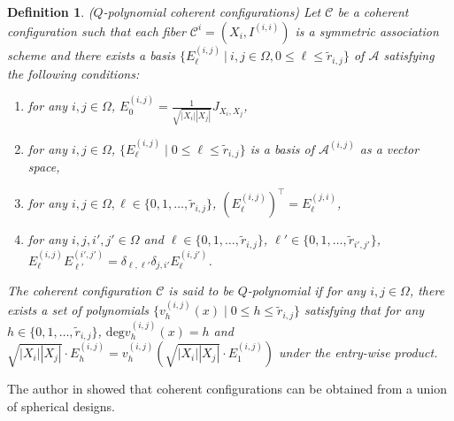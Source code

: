 \documentclass[11pt]{article}
\newtheorem{definition}{Definition}[section]
\theoremstyle{definition}
\theoremstyle{remark}
\begin{document}
\begin{definition}{\rm ($Q$-polynomial coherent configurations)}
Let $\mathcal{C}$ be a coherent configuration such that each fiber $\mathcal{C}^i=(X_i,I^{(i,i)})$ is a symmetric association scheme and there exists a basis $\{  {E}^{(i,j)}_{\ell} \ |\  i, j \in  \Omega, 0\leq\ell  \leq \widetilde{r}_{i,j}\}$ of $\mathcal{A}$ satisfying the following conditions: 
\begin{enumerate}
\item[(B1)] for any $i,j\in\Omega$, $  {E}_0^{(i,j)}=\frac{1}{\sqrt{|X_i||X_j|}}  {J}_{X_i,X_j}$, 
\item[(B2)] for any $i,j\in\Omega$, $\{E_\ell^{(i,j)}\mid 0\leq \ell \leq \widetilde{r}_{i,j}\}$ is a basis of $\mathcal{A}^{(i,j)}$ as a vector space, 
\item[(B3)] for any $i,j\in\Omega,\ell\in \{0,1,\ldots,\widetilde{r}_{i,j}\}$, $(E_\ell^{(i,j)})^\top=E_\ell^{(j,i)}$,
\item[(B4)] for any $i,j,i',j'\in\Omega$ and $\ell\in \{0,1,\ldots,\widetilde{r}_{i,j}\}$, $\ell'\in \{0,1,\ldots,\widetilde{r}_{i',j'}\}$, $E_\ell^{(i,j)}E_{\ell'}^{(i',j')}=\delta_{\ell,\ell'}\delta_{j,i'}E_\ell^{(i,j')}$.
\end{enumerate}
The coherent configuration $\mathcal{C}$ is said to be $Q$-polynomial if for any $i,j\in\Omega$, there exists a set of polynomials $\{v_h^{(i,j)}(x)\mid  0\leq h\leq \widetilde{r}_{i,j}\}$ satisfying that for any $h\in\{0,1,\ldots,\widetilde{r}_{i,j}\}$, $\mathrm{deg}v_h^{(i,j)}(x)=h$ and $\sqrt{|X_i||X_j|}\cdot   {E}_h^{(i,j)}=v_h^{(i,j)}(\sqrt{|X_i||X_j|}\cdot   {E}_1^{(i,j)})$ under the entry-wise product. 

\end{definition}

The author in \cite{Suda10} showed that coherent configurations can be obtained from a union of spherical designs.
\end{document}
